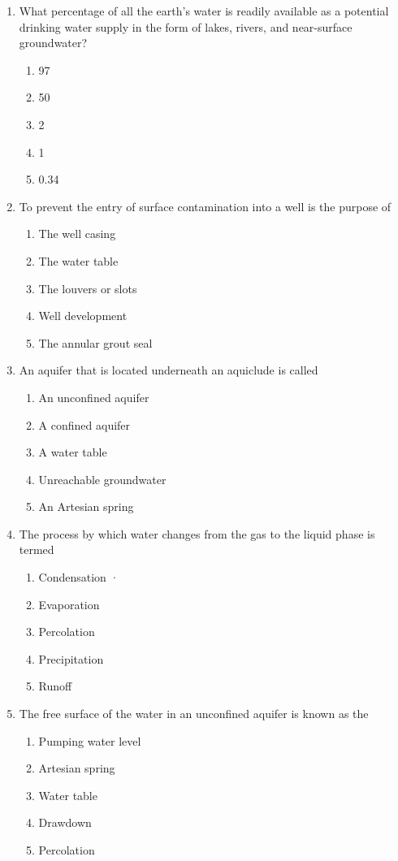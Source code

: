 \begin{enumerate}
\item What percentage of all the earth's water is readily available as a potential drinking water supply in the form of lakes, rivers, and near-surface groundwater?
\begin{enumerate}
\item 97%
\item 50%
\item 2%
\item 1%
\item 0.34%
\end{enumerate}

\item To  prevent the entry of surface contamination into a well is the purpose of
\begin{enumerate}
\item The well casing
\item The water table
\item The louvers or slots
\item Well development
\item The  annular grout seal	
\end{enumerate}

\item An aquifer that is located underneath an aquiclude is called
\begin{enumerate}
\item An unconfined aquifer
\item A confined aquifer
\item A water table
\item Unreachable groundwater
\item An Artesian spring
\end{enumerate}

\item The process by which water changes from the gas to the liquid phase is termed
\begin{enumerate}
\item Condensation	·
\item Evaporation
\item Percolation
\item Precipitation
\item Runoff
\end{enumerate}

\item The free surface of the water in an unconfined aquifer is known as the
\begin{enumerate}
\item Pumping water level
\item Artesian spring
\item Water table
\item Drawdown
\item Percolation
\end{enumerate}


\end{enumerate}
